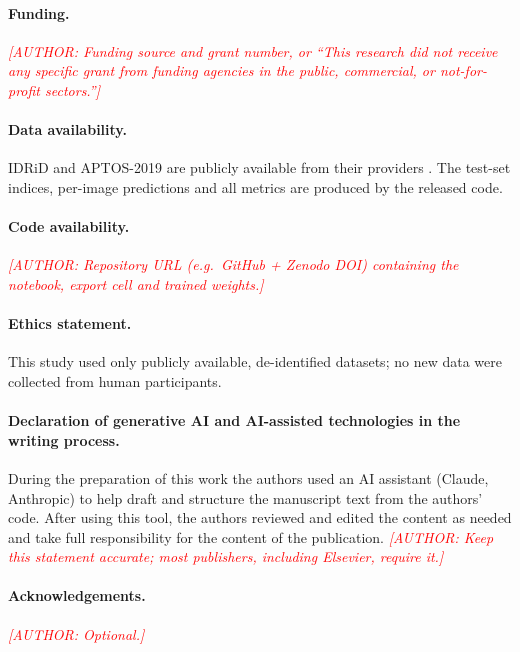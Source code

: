 \documentclass[11pt,a4paper]{article}
\newcommand{\authnote}[1]{\textcolor{red}{\textit{[AUTHOR: #1]}}}
\begin{document}
\paragraph{Funding.} \authnote{Funding source and grant number, or ``This research did not receive any specific grant
from funding agencies in the public, commercial, or not-for-profit sectors.''}

\paragraph{Data availability.}
IDRiD and APTOS-2019 are publicly available from their providers \citep{porwal2018idrid,aptos2019}. The test-set
indices, per-image predictions and all metrics are produced by the released code.

\paragraph{Code availability.}
\authnote{Repository URL (e.g.\ GitHub + Zenodo DOI) containing the notebook, export cell and trained weights.}

\paragraph{Ethics statement.}
This study used only publicly available, de-identified datasets; no new data were collected from human participants.

\paragraph{Declaration of generative AI and AI-assisted technologies in the writing process.}
During the preparation of this work the authors used an AI assistant (Claude, Anthropic) to help draft and structure
the manuscript text from the authors' code. After using this tool, the authors reviewed and edited the content as
needed and take full responsibility for the content of the publication.
\authnote{Keep this statement accurate; most publishers, including Elsevier, require it.}

\paragraph{Acknowledgements.} \authnote{Optional.}




\clearpage
\label{start:supp}

\end{document}
